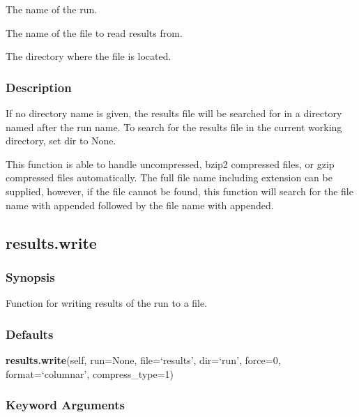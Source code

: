   The name of the run.   

   The name of the file to read results from.   

   The directory where the file is located.  

  

  
 \subsubsection{Description} 

 If no directory name is given, the results file will be searched for in a directory named after the run name.  To search for the results file in the current working directory, set dir to None. 
  

 This function is able to handle uncompressed, bzip2 compressed files, or gzip compressed files automatically.  The full file name including extension can be supplied, however, if the file cannot be found, this function will search for the file name with  appended followed by the file name with  appended. 
  

  

 \newpage 

 \subsection{results.write} 

  
 \subsubsection{Synopsis} 

 Function for writing results of the run to a file. 
  

  
 \subsubsection{Defaults} 

 \textsf{\textbf{results.write}(self, run=None, file=`results', dir=`run', force=0, format=`columnar', compress\_type=1)} 

  
 \subsubsection{Keyword Arguments} 

